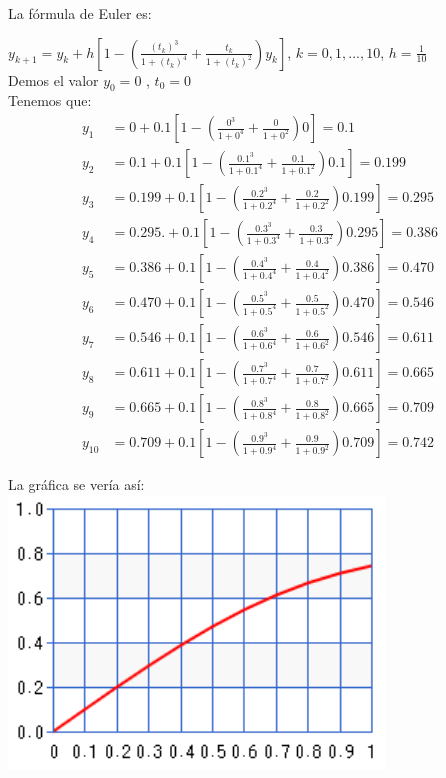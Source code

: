 \documentclass[14pt]{extarticle}
\begin{document}
\begin{enumerate}
{\begin{enumerate}
{                    La fórmula de Euler es:

                    $y_{k+1} = y_{k} + h[1 - (\frac{(t_{k})^3}{1 + (t_{k})^4} + \frac{t_{k}}{1 + (t_{k})^2})y_{k}]$, $k = 0,1,...,10$, $h = \frac{1}{10}$\\

                    Demos el valor $y_{0} = 0$ , $t_{0} = 0$\\

                    Tenemos que:
                    \begin{align*}
                    y_{1}&= 0 + 0.1[1- (\frac{0^3}{1+ 0^4} + \frac{0}{1+ 0^2} ) 0] = 0.1\\
                    y_{2}&= 0.1 + 0.1[1- (\frac{0.1^3}{1+ 0.1^4} + \frac{0.1}{1+ 0.1^2} ) 0.1] = 0.199\\
                    y_{3}&= 0.199 + 0.1[1- (\frac{0.2^3}{1+ 0.2^4} + \frac{0.2}{1+ 0.2^2} ) 0.199] = 0.295\\
                    y_{4}&= 0.295. + 0.1[1- (\frac{0.3^3}{1+ 0.3^4} + \frac{0.3}{1+ 0.3^2} ) 0.295] = 0.386\\
                    y_{5}&= 0.386 + 0.1[1- (\frac{0.4^3}{1+ 0.4^4} + \frac{0.4}{1+ 0.4^2} ) 0.386] = 0.470\\
                    y_{6}&= 0.470 + 0.1[1- (\frac{0.5^3}{1+ 0.5^4} + \frac{0.5}{1+ 0.5^2} ) 0.470] = 0.546\\
                    y_{7}&= 0.546 + 0.1[1- (\frac{0.6^3}{1+ 0.6^4} + \frac{0.6}{1+ 0.6^2} ) 0.546] = 0.611\\
                    y_{8}&= 0.611 + 0.1[1- (\frac{0.7^3}{1+ 0.7^4} + \frac{0.7}{1+ 0.7^2} ) 0.611] = 0.665\\
                    y_{9}&= 0.665 + 0.1[1- (\frac{0.8^3}{1+ 0.8^4} + \frac{0.8}{1+ 0.8^2} ) 0.665] = 0.709\\
                    y_{10}&= 0.709 + 0.1[1- (\frac{0.9^3}{1+ 0.9^4} + \frac{0.9}{1+ 0.9^2} ) 0.709] = 0.742
                    \end{align*}
                    
                    La gráfica se vería así:\\
                    
                    \centering
                    \includegraphics[width=10cm]{1b.png}\\
                    
}
\end{enumerate}}
\end{enumerate}
\end{document}
